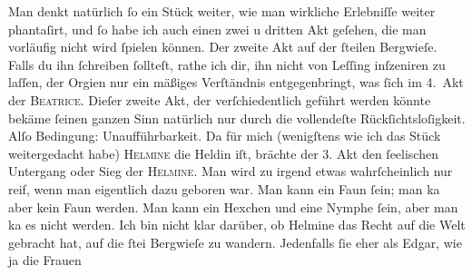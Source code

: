 \pstart
           Man denkt natürlich{ }ſo ein Stück weiter, wie man wirkliche Erlebniſſe weiter
               phantaſirt, und{ }ſo habe ich auch einen zwei u dritten Akt geſehen, die man vorläufig nicht wird{ }ſpielen können. Der
               zweite Akt auf der{ }ſteilen Bergwieſe. Falls du ihn{ }ſchreiben{ }ſollteſt, rathe ich dir,
               ihn nicht von Leſſing inſzeniren zu laſſen,
               der Orgien nur ein mäßiges Verſtändnis entgegenbringt, was {\pb}ſich im 4. Akt der \textsc{Beatrice}\label{K_L01604-1v}\label{K_L01604-1}. Dieſer
               zweite Akt, der verſchiedentlich geführt werden könnte bekäme{ }ſeinen ganzen Sinn
               natürlich nur durch die vollendeſte Rückſichtsloſigkeit. Alſo Bedingung:
               Unaufführbarkeit. Da für mich (wenigſtens wie ich das Stück weitergedacht habe) \textsc{Helmine} die Heldin iſt, brächte der 3. Akt den{ }ſeelischen Untergang oder Sieg der \textsc{Helmine}. Man wird zu irgend etwas wahrſcheinlich nur reif, wenn man eigentlich dazu
               geboren war. Man kann ein Faun{ }ſein; man ka{\geminationn}{ }{\pb}aber kein Faun werden.
               Man kann ein Hexchen und eine Nymphe{ }ſein, aber man ka{\geminationn}
               es nicht werden. Ich bin nicht klar darüber, ob Helmine das Recht auf die Welt gebracht hat, auf die{ }ſtei Bergwieſe zu wandern. Jedenfalls{ }ſie eher als Edgar, wie ja die Frauen
